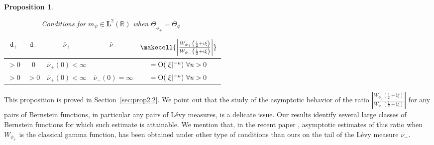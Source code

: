\documentclass[12pt]{amsart}
\newcommand{\hlabel}{\phantomsection\label}
\numberwithin{equation}{section}
\newcommand{\bb}{\mathbb}
\newcommand{\ov}{\overline}
\newcommand{\ttt}{\mathtt}
\newcommand{\bmrm}[2][2]{\mathbf{#2}^{#1}}
\newcommand{\Wphi}{\frac{W_{\phi_+}\left(\frac{1}{2}+\mathrm{i}\xi\right)}{W_{\phi_-}\left(\frac{1}{2}+\mathrm{i}\xi\right)}}
\newcommand{\Wphiinv}{\frac{W_{\phi_-}\left(\frac{1}{2}+\mathrm{i}\xi\right)}{W_{\phi_+}\left(\frac{1}{2}+\mathrm{i}\xi\right)}}
\renewcommand{\i}{\mathrm{i}}
\newtheorem{prop}[thm]{Proposition}
\theoremstyle{definition}
\theoremstyle{assump}
\theoremstyle{remark}
\begin{document}
\begin{prop}
\begin{enumerate}[(i)]
\begin{table}[h]
		\begin{center}{
			\centering\makegapedcells
			\begin{tabular}{|c|c|c|c|c|}
				\hline
				$\ttt{d}_+$ & $\ttt{d}_-$ & $\ov{\nu}_+$ & $\ov{\nu}_-$ & $\makecell{\left|\Wphi\right|}$ \\  %
				\hline
				$>0$ & $0$ & $\ov{\nu}_+(0)<\infty$ & & $={\rm{O}}(|\xi|^{-u}) \ \forall u>0$ \\
				\hline
				$>0$ & $>0$ & $\ov{\nu}_+(0)<\infty$ & $\ov{\nu}_-(0)=\infty$ & $={\rm{O}}(|\xi|^{-u}) \ \forall u>0$ \\
				\hline
			\end{tabular}}
		\caption{Conditions for $m_{\psi}\in\bmrm{L}(\bb{R})$ when $\underline{\Theta}_{\phi_+}=\ov{\Theta}_{\phi_-}$} \hlabel{tab:zero}
	\end{center}
	\end{table}
\end{enumerate}
\end{prop}
This proposition is proved in Section~\ref{sec:prop2.2}.
We point out that the study of the asymptotic behavior of the ratio $\left|\Wphi\right|$ for any pairs of Bernstein functions, in particular any pairs of L\'evy measures, is a delicate issue. Our results identify several large  classes of Bernstein functions for which such estimate is attainable. We mention that, in the recent paper \cite{Sav-M}, asymptotic estimates of this ratio when $W_{\phi_+}$ is the classical gamma function, has been obtained under other type of conditions than ours on the tail of the L\'evy measure $\ov{\nu}_-$.
\end{document}
